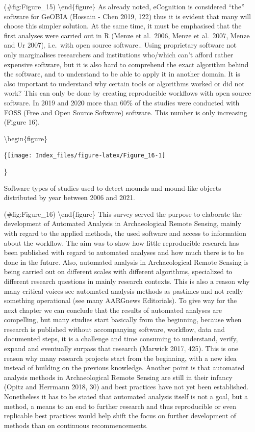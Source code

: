 \documentclass[
]{article}
\begin{document}
(\#fig:Figure\_15)
\textbackslash end\{figure\}
As already noted, eCognition is considered ``the'' software for GeOBIA (Hossain - Chen 2019, 122) thus it is evident that many will choose this simpler solution. At the same time, it must be emphasised that the first analyses were carried out in R (Menze et al.~2006, Menze et al.~2007, Menze and Ur 2007), i.e.~with open source software.. Using proprietary software not only marginalises researchers and institutions who/which can't afford rather expensive software, but it is also hard to comprehend the exact algorithm behind the software, and to understand to be able to apply it in another domain. It is also important to understand why certain tools or algorithms worked or did not work? This can only be done by creating reproducible workflows with open source software. In 2019 and 2020 more than 60\% of the studies were conducted with FOSS (Free and Open Source Software) software. This number is only increasing (Figure 16).

\textbackslash begin\{figure\}

\{\centering \texttt{[image: Index\_files/figure-latex/Figure\_16-1]}

\}

\caption{Software types of studies used to detect mounds and mound-like objects distributed by year between 2006 and 2021.}

(\#fig:Figure\_16)
\textbackslash end\{figure\}
This survey served the purpose to elaborate the development of Automated Analysis in Archaeological Remote Sensing, mainly with regard to the applied methods, the used software and access to information about the workflow. The aim was to show how little reproducible research has been published with regard to automated analyses and how much there is to be done in the future. Also, automated analysis in Archaeological Remote Sensing is being carried out on different scales with different algorithms, specialized to different research questions in mainly research contexts. This is also a reason why many critical voices see automated analysis methods as pastimes and not really something operational (see many AARGnews Editorials). To give way for the next chapter we can conclude that the results of automated analyses are compelling, but many studies start basically from the beginning, because when research is published without accompanying software, workflow, data and documented steps, it is a challenge and time consuming to understand, verify, expand and eventually surpass that research (Marwick 2017, 425). This is one reason why many research projects start from the beginning, with a new idea instead of building on the previous knowledge. Another point is that automated analysis methods in Archaeological Remote Sensing are still in their infancy (Opitz and Herrmann 2018, 30) and best practices have not yet been established. Nonetheless it has to be stated that automated analysis itself is not a goal, but a method, a means to an end to further research and thus reproducible or even replicable best practices would help shift the focus on further development of methods than on continuous recommencements.
\end{document}

